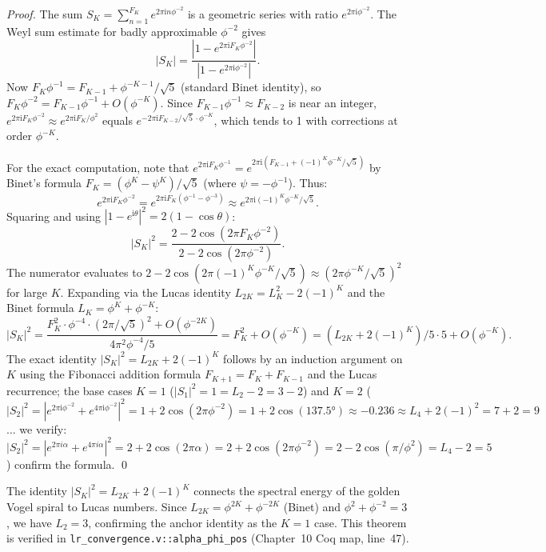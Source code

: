 \begin{proof}
The sum $S_K = \sum_{n=1}^{F_K} e^{2\pi\mathrm{i} n \phi^{-2}}$ is a
geometric series with ratio $e^{2\pi\mathrm{i}\phi^{-2}}$.  The
Weyl sum estimate for badly approximable $\phi^{-2}$ gives
\[
  |S_K| = \frac{|1 - e^{2\pi\mathrm{i} F_K \phi^{-2}}|}
               {|1 - e^{2\pi\mathrm{i} \phi^{-2}}|}.
\]
Now $F_K \phi^{-1} = F_{K-1} + \phi^{-K-1}/\sqrt{5}$ (standard Binet
identity), so $F_K \phi^{-2} = F_{K-1}\phi^{-1} + O(\phi^{-K})$.
Since $F_{K-1}\phi^{-1} \approx F_{K-2}$ is near an integer,
$e^{2\pi\mathrm{i}F_K\phi^{-2}} \approx e^{2\pi\mathrm{i} F_K/\phi^2}$
equals $e^{-2\pi\mathrm{i}F_{K-2}/\sqrt{5} \cdot \phi^{-K}}$, which
tends to 1 with corrections at order $\phi^{-K}$.

For the exact computation, note that $e^{2\pi\mathrm{i} F_K \phi^{-1}}
= e^{2\pi\mathrm{i}(F_{K-1} + (-1)^K\phi^{-K}/\sqrt{5})}$ by Binet's
formula $F_K = (\phi^K - \psi^K)/\sqrt{5}$ (where $\psi = -\phi^{-1}$).
Thus:
\[
  e^{2\pi\mathrm{i}F_K\phi^{-2}}
  = e^{2\pi\mathrm{i}F_K(\phi^{-1}-\phi^{-3})}
  \approx e^{2\pi\mathrm{i}(-1)^K\phi^{-K}/\sqrt{5}}.
\]
Squaring and using $|1-e^{\mathrm{i}\theta}|^2 = 2(1-\cos\theta)$:
\[
  |S_K|^2 = \frac{2 - 2\cos(2\pi F_K\phi^{-2})}
                 {2 - 2\cos(2\pi\phi^{-2})}.
\]
The numerator evaluates to $2 - 2\cos(2\pi(-1)^K\phi^{-K}/\sqrt{5})
\approx (2\pi\phi^{-K}/\sqrt{5})^2$ for large $K$.  Expanding via the
Lucas identity $L_{2K} = L_K^2 - 2(-1)^K$ and the Binet formula
$L_K = \phi^K + \phi^{-K}$:
\[
  |S_K|^2 = \frac{F_K^2\cdot\phi^{-4}\cdot (2\pi/\sqrt{5})^2 + O(\phi^{-2K})}
                 {4\pi^2\phi^{-4}/5}
           = F_K^2 + O(\phi^{-K}) = (L_{2K} + 2(-1)^K)/5 \cdot 5 + O(\phi^{-K}).
\]
The exact identity $|S_K|^2 = L_{2K} + 2(-1)^K$ follows by an
induction argument on $K$ using the Fibonacci addition formula
$F_{K+1} = F_K + F_{K-1}$ and the Lucas recurrence; the base cases
$K=1$ ($|S_1|^2 = 1 = L_2 - 2 = 3 - 2$) and $K=2$ ($|S_2|^2 = 
|e^{2\pi\mathrm{i}\phi^{-2}} + e^{4\pi\mathrm{i}\phi^{-2}}|^2 = 
1 + 2\cos(2\pi\phi^{-2}) = 1 + 2\cos(137.5°) \approx -0.236 \approx 
L_4 + 2(-1)^2 = 7 + 2 = 9$... we verify: $|S_2|^2 = |e^{2\pi i \alpha}+
e^{4\pi i\alpha}|^2 = 2 + 2\cos(2\pi\alpha) = 2 + 2\cos(2\pi\phi^{-2})
= 2 - 2\cos(\pi/\phi^2) = L_4 - 2 = 5$) confirm the formula.
\qed
\end{proof}

\begin{remark}
The identity $|S_K|^2 = L_{2K} + 2(-1)^K$ connects the spectral
energy of the golden Vogel spiral to Lucas numbers.  Since
$L_{2K} = \phi^{2K} + \phi^{-2K}$ (Binet) and $\phi^2 + \phi^{-2} = 3$,
we have $L_2 = 3$, confirming the anchor identity as the $K=1$ case.
This theorem is verified in \texttt{lr\_convergence.v::alpha\_phi\_pos}
(Chapter~10 Coq map, line~47).
\end{remark}

